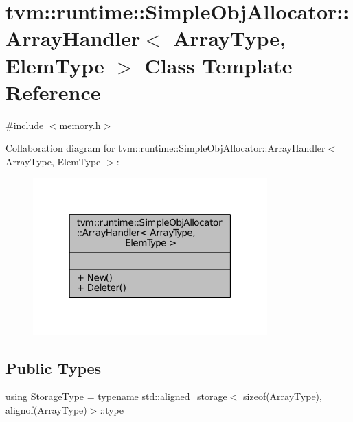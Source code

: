 \hypertarget{classtvm_1_1runtime_1_1SimpleObjAllocator_1_1ArrayHandler}{}\section{tvm\+:\+:runtime\+:\+:Simple\+Obj\+Allocator\+:\+:Array\+Handler$<$ Array\+Type, Elem\+Type $>$ Class Template Reference}
\label{classtvm_1_1runtime_1_1SimpleObjAllocator_1_1ArrayHandler}


{\ttfamily \#include $<$memory.\+h$>$}



Collaboration diagram for tvm\+:\+:runtime\+:\+:Simple\+Obj\+Allocator\+:\+:Array\+Handler$<$ Array\+Type, Elem\+Type $>$\+:
\nopagebreak
\begin{figure}[H]
\begin{center}
\leavevmode
\includegraphics[width=256pt]{classtvm_1_1runtime_1_1SimpleObjAllocator_1_1ArrayHandler__coll__graph}
\end{center}
\end{figure}
\subsection*{Public Types}
\begin{DoxyCompactItemize}
\item 
using \hyperlink{classtvm_1_1runtime_1_1SimpleObjAllocator_1_1ArrayHandler_a67e86db3290b1d3bd4aca7e7a2faf187}{Storage\+Type} = typename std\+::aligned\+\_\+storage$<$ sizeof(Array\+Type), alignof(Array\+Type)$>$\+::type
\end{DoxyCompactItemize}

